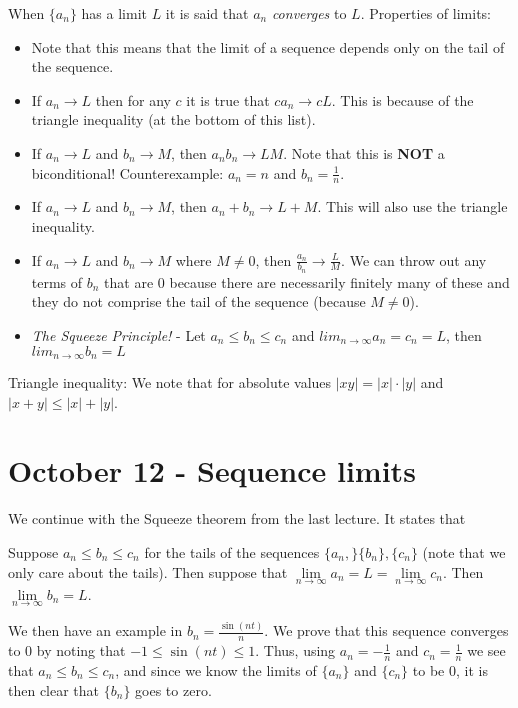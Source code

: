 \documentclass{report}
\begin{document}
When $\{a_n\}$ has a limit $L$ it is said that $a_n$ \emph{converges} to $L$. Properties of limits:

\begin{itemize}
\item Note that this means that the limit of a sequence depends only on the tail of the sequence.
\item If $a_n \to L$ then for any $c$ it is true that $ca_n \to cL$. This is because of the triangle inequality (at the bottom of this list).
\item If $a_n \to L$ and $b_n \to M$, then $a_nb_n \to LM$. Note that this is \textbf{NOT} a biconditional! Counterexample: $a_n = n$ and $b_n = \frac{1}{n}$.
\item If $a_n \to L$ and $b_n \to M$, then $a_n + b_n \to L + M$. This will also use the triangle inequality.
\item If $a_n \to L$ and $b_n \to M$ where $M \neq 0$, then $\frac{a_n}{b_n} \to \frac{L}{M}$. We can throw out any terms of $b_n$ that are $0$ because there are necessarily finitely many of these and they do not comprise the tail of the sequence (because $M \neq 0$). 
\item \emph{The Squeeze Principle!} - Let $a_n \leq b_n \leq c_n$ and $lim_{n \to \infty} a_n = c_n = L$, then $lim_{n \to \infty} b_n = L$
\end{itemize}

Triangle inequality: We note that for absolute values $|xy| = |x| \cdot |y|$ and $|x + y| \leq |x| + |y|$.

\chapter{October 12 - Sequence limits}

We continue with the Squeeze theorem from the last lecture. It states that

\begin{center}
Suppose $a_n \leq b_n \leq c_n$ for the tails of the sequences $\{a_n,\} \{b_n\}, \{c_n\}$ (note that we only care about the tails). Then suppose that $\displaystyle\lim\limits_{n \to \infty} a_n = L = \displaystyle\lim\limits_{n \to \infty} c_n$. Then $\displaystyle\lim\limits_{n \to\infty}{b_n} = L$. 
\end{center}

We then have an example in $b_n = \frac{\sin(nt)}{n}$. We prove that this sequence converges to $0$ by noting that $-1 \leq \sin(nt) \leq 1$. Thus, using $a_n = -\frac{1}{n}$ and $c_n = \frac{1}{n}$ we see that $a_n \leq b_n \leq c_n$, and since we know the limits of $\{a_n\}$ and $\{c_n\}$ to be $0$, it is then clear that $\{b_n\}$ goes to zero. 
\end{document}

